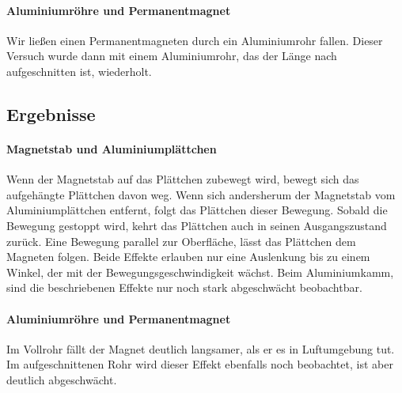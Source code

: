 \documentclass[
	a4paper,
	12pt,
	pagesize,
	ngerman
]{scrartcl}
\begin{document}
	\paragraph{Aluminiumröhre und Permanentmagnet}
	Wir ließen einen Permanentmagneten durch ein Aluminiumrohr fallen. Dieser Versuch wurde dann mit einem Aluminiumrohr, das der Länge nach aufgeschnitten ist, wiederholt.
	\subsection{Ergebnisse}
	\paragraph{Magnetstab und Aluminiumplättchen}
	Wenn der Magnetstab auf das Plättchen zubewegt wird, bewegt sich das aufgehängte Plättchen davon weg. Wenn sich andersherum der Magnetstab vom Aluminiumplättchen entfernt, folgt das Plättchen dieser Bewegung. Sobald die Bewegung gestoppt wird, kehrt das Plättchen auch in seinen Ausgangszustand zurück. Eine Bewegung parallel zur Oberfläche, lässt das Plättchen dem Magneten folgen. Beide Effekte erlauben nur eine Auslenkung bis zu einem Winkel, der mit der Bewegungsgeschwindigkeit wächst. %
	Beim Aluminiumkamm, sind die beschriebenen Effekte nur noch stark abgeschwächt beobachtbar.
	\paragraph{Aluminiumröhre und Permanentmagnet}
	Im Vollrohr fällt der Magnet deutlich langsamer, als er es in Luftumgebung tut. Im aufgeschnittenen Rohr wird dieser Effekt ebenfalls noch beobachtet, ist aber deutlich abgeschwächt.
\end{document}
